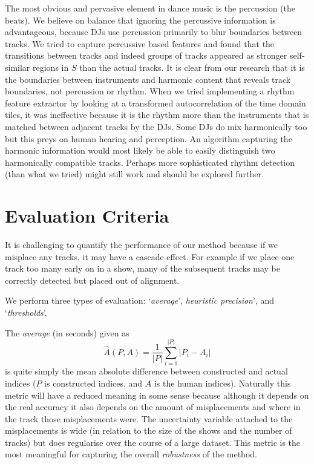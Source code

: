 \documentclass[twocolumn]{article}
\begin{document}
	The most obvious and pervasive element in dance music is the percussion (the beats). We believe on balance that ignoring the percussive information is advantageous, because DJs use percussion primarily to blur boundaries between tracks.  We tried to capture percussive based features and found that the transitions between tracks and indeed groups of tracks appeared as stronger self-similar regions in $S$ than the actual tracks. It is clear from our research that it is the boundaries between instruments and harmonic content that reveals track boundaries, not percussion or rhythm. When we tried implementing a rhythm feature extractor by looking at a transformed autocorrelation of the time domain tiles, it was ineffective because it is the rhythm more than the instruments that is matched between adjacent tracks by the DJs. Some DJs do mix harmonically too but this preys on human hearing and perception. An algorithm capturing the harmonic information would most likely be able to easily distinguish two harmonically compatible tracks. Perhaps more sophisticated rhythm detection (than what we tried) might still work and should be explored further. 
	
	
	\section{Evaluation Criteria}\label{eval_crit}
	
	It is challenging to quantify the performance of our method because if we misplace any tracks, it may have a cascade effect. For example if we place one track too many early on in a show, many of the subsequent tracks may be correctly detected but placed out of alignment. 
	
	We perform three types of evaluation: `\textit{average}', \textit{heuristic precision}', and `\textit{thresholds}'.
	
	The \textit{average} (in seconds) given as $$\hat A(P,A) = \frac{1}{|P|}\sum_{i=1}^{|P|}{|P_i-A_i|}$$ is quite simply the mean absolute difference between constructed and actual indices ($P$ is constructed indices, and $A$ is the human indices). Naturally this metric will have a reduced meaning in some sense because although it depends on the real accuracy it also depends on the amount of misplacements and where in the track those misplacements were. The uncertainty variable attached to the misplacements is wide (in relation to the size of the shows and the number of tracks) but does regularise over the course of a large dataset. This metric is the most meaningful for capturing the overall \textit{robustness} of the method.
	
\end{document}
